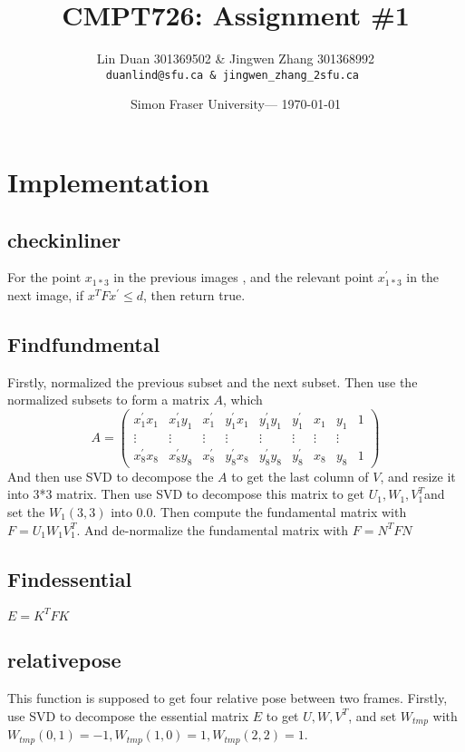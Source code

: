 \documentclass{article}
\title{CMPT726: Assignment \#1} %
\author{Lin Duan 301369502 \& Jingwen Zhang 301368992 \\ \texttt{duanlind@sfu.ca \& jingwen\_zhang\_2sfu.ca }} %
\date{Simon Fraser University--- \today} %
\begin{document}
	
	\maketitle %
	
	
	\section{Implementation} 
	\subsection{checkinliner} 
	For the point $x_{1*3}$ in the previous images , and the relevant point $x_{1*3}^{'}$ in the next image,  if $x^{T} F x^{'} \leq  d$, then return true.
	\subsection{Findfundmental}
	Firstly, normalized the previous subset and the next subset. Then use the normalized subsets to form a matrix $A$, which $$A = \begin{pmatrix}
	x_{1}^{'}x_{1} & x_{1}^{'}y_{1} & x_{1}^{'} & y_{1}^{'}x_{1} & y_{1}^{'}y_{1} & y_{1}^{'} & x_1 & y_1 & 1 \\
	\vdots & \vdots & \vdots & \vdots & \vdots & \vdots & \vdots & \vdots  \\
	x_{8}^{'}x_{8} & x_{8}^{'}y_{8} & x_{8}^{'} & y_{8}^{'}x_{8} & y_{8}^{'}y_{8} & y_{8}^{'} & x_8 & y_8 & 1
	\end{pmatrix}$$
	And then use SVD to decompose the $A$ to get the last column of $V$, and resize it into 3*3 matrix. Then use SVD to decompose this matrix to get $U_1, W_1, V_{1}^{T}$and set the $W_1(3,3)$ into 0.0. Then compute the fundamental matrix with $F= U_1 W_1 V_{1}^{T}$. And de-normalize the fundamental matrix with $F = N^{T}FN$
	
	\subsection{Findessential}
	$E = K^{T} F K$
	\subsection{relativepose}
	This function is supposed to get four relative pose between two frames. Firstly, use SVD to decompose the essential matrix $E$ to get $U, W, V^{T}$, and set $W_{tmp}$ with $W_{tmp}(0,1) = -1, W_{tmp}(1,0) = 1, W_{tmp}(2,2) = 1$. 
	
\end{document}
